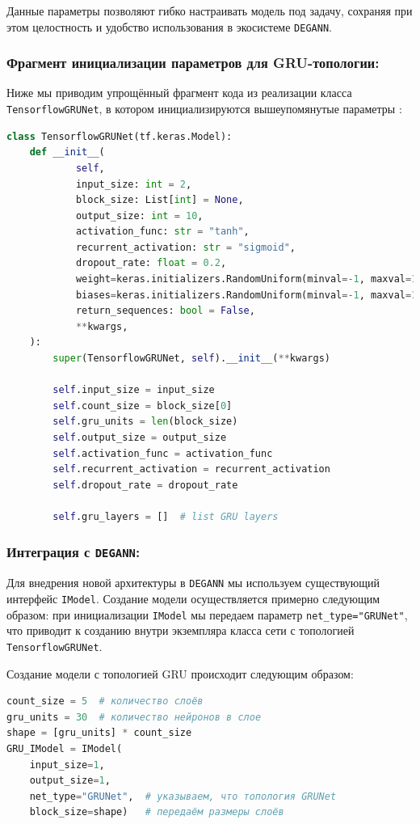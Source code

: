 Данные параметры позволяют гибко настраивать модель под задачу, сохраняя при этом целостность и удобство использования в экосистеме \texttt{DEGANN}.

\subsubsection{Фрагмент инициализации параметров для GRU-топологии:}
Ниже мы приводим упрощённый фрагмент кода из реализации класса \texttt{TensorflowGRUNet}, в котором инициализируются вышеупомянутые параметры   :

\begin{lstlisting}[language=Python, breaklines, caption={Фрагмент инициализации параметров в \texttt{TensorflowGRUNet}}]
class TensorflowGRUNet(tf.keras.Model):
    def __init__(
            self,
            input_size: int = 2,
            block_size: List[int] = None,
            output_size: int = 10,
            activation_func: str = "tanh",
            recurrent_activation: str = "sigmoid",
            dropout_rate: float = 0.2,
            weight=keras.initializers.RandomUniform(minval=-1, maxval=1),
            biases=keras.initializers.RandomUniform(minval=-1, maxval=1),
            return_sequences: bool = False,
            **kwargs,
    ):
        super(TensorflowGRUNet, self).__init__(**kwargs)

        self.input_size = input_size
        self.count_size = block_size[0]
        self.gru_units = len(block_size)
        self.output_size = output_size
        self.activation_func = activation_func
        self.recurrent_activation = recurrent_activation
        self.dropout_rate = dropout_rate

        self.gru_layers = []  # list GRU layers
\end{lstlisting}

\subsubsection{Интеграция с \texttt{DEGANN}:}
Для внедрения новой архитектуры в \texttt{DEGANN} мы используем существующий интерфейс \texttt{IModel}. Создание модели осуществляется примерно следующим образом: при инициализации \texttt{IModel} мы передаем параметр \texttt{net\_type="GRUNet"}, что приводит к созданию внутри экземпляра класса сети с топологией \texttt{TensorflowGRUNet}.

Создание модели с топологией GRU происходит следующим образом:

\begin{lstlisting}[language=Python, caption=Создание модели с использованием топологии GRUNet]
count_size = 5  # количество слоёв
gru_units = 30  # количество нейронов в слое
shape = [gru_units] * count_size
GRU_IModel = IModel(
    input_size=1,
    output_size=1,
    net_type="GRUNet",  # указываем, что топология GRUNet
    block_size=shape)   # передаём размеры слоёв
\end{lstlisting}

